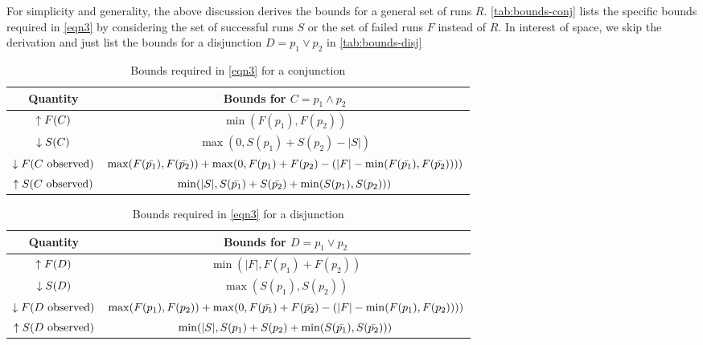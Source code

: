 For simplicity and generality, the above discussion derives the bounds for a general 
set of runs $R$.  \autoref{tab:bounds-conj} lists the specific bounds required in
\autoref{eqn3} by considering the set of successful runs $S$ or the set of failed
runs $F$ instead of $R$.  In interest of space, we skip the derivation and just 
list the bounds for a disjunction $D = p_1 \vee p_2$ in \autoref{tab:bounds-disj}

\begin{table*}
  \caption{Bounds required in \autoref{eqn3} for a conjunction}
  \label{tab:bounds-conj}
  \centering
  \begin{tabular}{c|c}
    Quantity & Bounds for $C = p_1 \wedge p_2$ \\
    \hline
    $\uparrow F(C) $
      &
      $\min(F(p_1), F(p_2))$
      \\      
    $\downarrow S(C)$
      &
      $\max(0, S(p_1) + S(p_2) - |S|)$
      \\
    $\downarrow F(\text{$C$ observed})$
      &
      $\max(F(\text{$\bar{p_1}$}), F(\text{$\bar{p_2}$})) +
      \max(0, F(p_1) + F(p_2) - (|F| - \min(F(\text{$\bar{p_1}$}), F(\text{$\bar{p_2}$}))))$
      \\
    $\uparrow S(\text{$C$ observed})$
      &
      $\min(|S|, S(\text{$\bar{p_1}$}) + S(\text{$\bar{p_2}$}) + \min(S(p_1), S(p_2)))$
      \\    
  \end{tabular}
\end{table*}

\begin{table*}
  \caption{Bounds required in \autoref{eqn3} for a disjunction}
  \label{tab:bounds-disj}
  \centering
  \begin{tabular}{c|c}
    Quantity & Bounds for $D = p_1 \vee p_2$ \\
    \hline
    $\uparrow F(D) $
      &
      $\min(|F|, F(p_1) + F(p_2))$
      \\      
    $\downarrow S(D)$
      &
      $\max(S(p_1), S(p_2))$
      \\
    $\downarrow F(\text{$D$ observed})$
      &
      $\max(F(p_1), F(p_2)) + 
      \max(0, F(\text{$\bar{p_1}$}) + F(\text{$\bar{p_2}$}) - (|F| - \min(F(p_1), F(p_2))))$
      \\
    $\uparrow S(\text{$D$ observed})$
      &
      $\min(|S|, S(p_1) + S(p_2) + \min(S(\text{$\bar{p_1}$}), S(\text{$\bar{p_2}$})))$
      \\    
  \end{tabular}
\end{table*}

